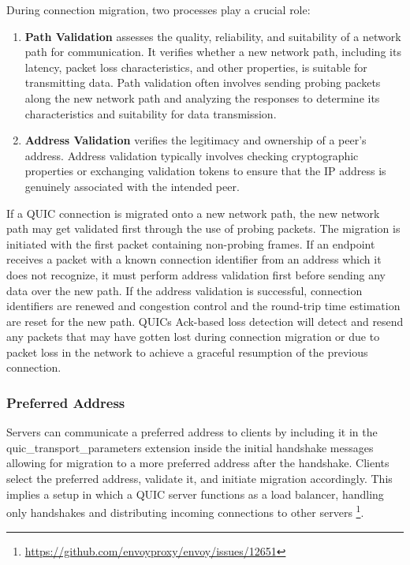 During connection migration, two processes play a crucial role:
\begingroup
\renewcommand\labelenumi{(\theenumi)}
\begin{enumerate}
\item \textbf{Path Validation} assesses the quality, reliability, and suitability of a network path for communication. It verifies
whether a new network path, including its latency, packet loss characteristics, and other properties, is suitable for transmitting
data. Path validation often involves sending probing packets along the new network path and analyzing the responses to determine its
characteristics and suitability for data transmission.\cite[46]{rfc9000} \label{path_validation}
\item \textbf{Address Validation} verifies the legitimacy and ownership of a peer's address. Address validation typically
involves checking cryptographic properties or exchanging validation tokens to ensure that the IP address is genuinely associated
with the intended peer. \cite[42]{rfc9000} \label{address_validation}
\end{enumerate}
\endgroup

If a QUIC connection is migrated onto a new network path, the new network path may get validated first through the use of probing
packets. The migration is initiated with the first packet containing non-probing frames. If an endpoint receives a packet with a
known connection identifier from an address which it does not recognize, it must perform address validation first before sending
any data over the new path. If the address validation is successful, connection identifiers are renewed and congestion control and
the round-trip time estimation are reset for the new path. QUICs Ack-based loss detection will detect and resend any packets that
may have gotten lost during connection migration or due to packet loss in the network to achieve a graceful resumption of the
previous connection.

\subsubsection{Preferred Address}

Servers can communicate a preferred address to clients by including it in the \\ quic\_transport\_parameters extension inside the initial handshake messages allowing for migration to a more preferred address after the handshake. Clients select the preferred address, validate it, and initiate migration accordingly. This implies a setup in which a QUIC server functions as a load balancer, handling only handshakes and distributing incoming connections to other servers \footnote{\url{https://github.com/envoyproxy/envoy/issues/12651}}.

